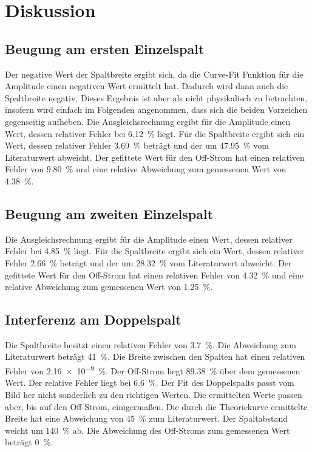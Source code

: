 \section{Diskussion}
\label{sec:Diskussion}


\subsection{Beugung am ersten Einzelspalt}
Der negative Wert der Spaltbreite ergibt sich, da die Curve-Fit Funktion für die Amplitude einen negativen Wert ermittelt hat. Dadurch wird dann auch die Spaltbreite negativ. Dieses Ergebnis ist aber als nicht physikalisch zu betrachten, insofern wird einfach im Folgenden angenommen, dass sich die beiden Vorzeichen gegenseitig aufheben. 
Die Ausgleichsrechnung ergibt für die Amplitude einen Wert, dessen relativer Fehler bei \SI{6.12}{\percent} liegt. Für die Spaltbreite ergibt sich ein Wert, dessen relativer Fehler \SI{3.69}{\percent} beträgt und der um \SI{47.95}{\percent} vom Literaturwert abweicht.
Der gefittete Wert für den Off-Strom hat einen relativen Fehler von \SI{9.80}{\percent} und eine relative Abweichung zum gemessenen Wert von \SI{4.38}{\percent}.


\subsection{Beugung am zweiten Einzelspalt}
Die Ausgleichsrechnung ergibt für die Amplitude einen Wert, dessen relativer Fehler bei \SI{4.85}{\percent} liegt. Für die Spaltbreite ergibt sich ein Wert, dessen relativer Fehler \SI{2.66}{\percent} beträgt und der um \SI{28.32}{\percent} vom Literaturwert abweicht.
Der gefittete Wert für den Off-Strom hat einen relativen Fehler von \SI{4.32}{\percent} und eine relative Abweichung zum gemessenen Wert von \SI{1.25}{\percent}.

\subsection{Interferenz am Doppelspalt}
Die Spaltbreite besitzt einen relativen Fehler von \SI{3.7}{\percent}. Die Abweichung zum Literaturwert beträgt \SI{41}{\percent}.  
Die Breite zwischen den Spalten hat einen relativen Fehler von \SI{2.16e-9}{\percent}. Der Off-Strom liegt \SI{89.38}{\percent} über dem gemessenen Wert. Der relative Fehler liegt bei \SI{6.6}{\percent}. Der Fit des Doppelspalts passt vom Bild her nicht sonderlich zu den richtigen Werten. Die ermittelten Werte passen aber, bis auf den Off-Strom, einigermaßen.
\newline
Die durch die Theoriekurve ermittelte Breite hat eine Abweichung von \SI{45}{\percent} zum Literaturwert.
Der Spaltabstand weicht um \SI{140}{\percent} ab. Die Abweichung des Off-Stroms zum gemessenen Wert beträgt \SI{0}{\percent}. 

